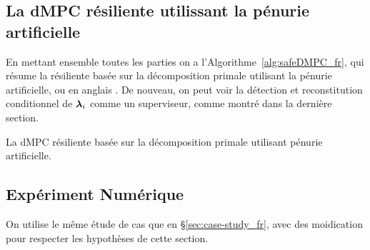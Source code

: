\documentclass[../main.tex]{subfiles}
\begin{document}
\subsection{La dMPC résiliente utilissant la pénurie artificielle}\label{sec:complete-safe-dmpc-ineq_fr}
En mettant ensemble toutes les parties on a l'Algorithme~\ref{alg:safeDMPC_fr}, qui résume la \dmpc{} résiliente basée sur la décomposition primale utilisant la pénurie artificielle, ou en anglais \rpdmpcas{}.
De nouveau, on peut voir la détection et reconstitution conditionnel de $\boldsymbol{\lambda}_{i}$ comme un superviseur, comme montré dans la dernière section.

\begin{algorithm2e}[h]
  \DontPrintSemicolon
 \caption{La dMPC résiliente basée sur la décomposition primale utilisant pénurie artificielle.}\label{alg:safeDMPC_fr}
\end{algorithm2e}

\subsection{Expériment Numérique}\label{sec:numerical-experiment-ineq_fr}

On utilise le même étude de cas que en \S\ref{sec:case-study_fr}, avec des moidication pour respecter les hypothèses de cette section.
\end{document}
